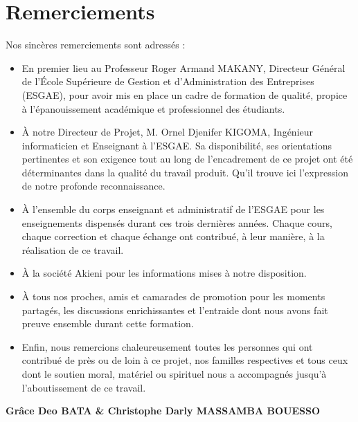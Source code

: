 \chapter*{Remerciements}
\pagestyle{styleGlobal}
\label{sec:remerciements}

Nos sincères remerciements sont adressés :

\vspace{0.1cm}

\begin{itemize}[leftmargin=1.5cm, itemsep=0.5cm, label={\textcolor{vertCongo}{\normalsize$\bullet$}}]
	
	\item En premier lieu au Professeur Roger Armand MAKANY, Directeur Général de l'École Supérieure de Gestion et d'Administration des Entreprises (ESGAE), pour avoir mis en place un cadre de formation de qualité, propice à l'épanouissement académique et professionnel des étudiants.
	
	\item À notre Directeur de Projet, M. Ornel Djenifer KIGOMA, Ingénieur informaticien et Enseignant à l'ESGAE. Sa disponibilité, ses orientations pertinentes et son exigence tout au long de l'encadrement de ce projet ont été déterminantes dans la qualité du travail produit. Qu'il trouve ici l'expression de notre profonde reconnaissance.
	
	\item À l'ensemble du corps enseignant et administratif de l'ESGAE pour les enseignements dispensés durant ces trois dernières années. Chaque cours, chaque correction et chaque échange ont contribué, à leur manière, à la réalisation de ce travail.
	
	\item À la société Akieni pour les informations mises à notre disposition.
	
	\item À tous nos proches, amis et camarades de promotion pour les moments partagés, les discussions enrichissantes et l'entraide dont nous avons fait preuve ensemble durant cette formation.
	
	\item Enfin, nous remercions chaleureusement toutes les personnes qui ont contribué de près ou de loin à ce projet, nos familles respectives et tous ceux dont le soutien moral, matériel ou spirituel nous a accompagnés jusqu'à l'aboutissement de ce travail.
	
\end{itemize}

\vspace{0.8cm}
\begin{flushright}
	\textbf{Grâce Deo BATA \& Christophe Darly MASSAMBA BOUESSO}
\end{flushright}
